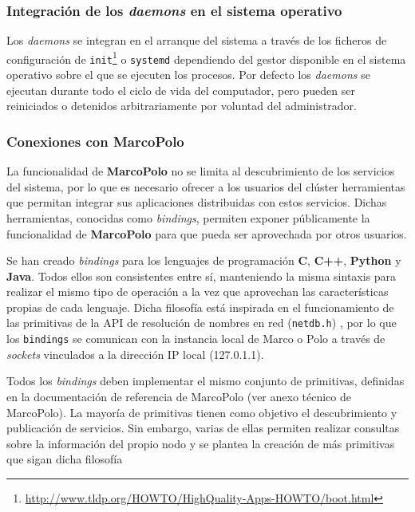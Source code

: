 \subsubsection{Integración de los \textit{daemons} en el sistema operativo}

Los \textit{daemons} se integran en el arranque del sistema a través de los ficheros de configuración de \texttt{init}\footnote{\href{http://www.tldp.org/HOWTO/HighQuality-Apps-HOWTO/boot.html}{http://www.tldp.org/HOWTO/HighQuality-Apps-HOWTO/boot.html}} o \texttt{systemd} dependiendo del gestor disponible en el sistema operativo sobre el que se ejecuten los procesos. Por defecto los \textit{daemons} se ejecutan durante todo el ciclo de vida del computador, pero pueden ser reiniciados o detenidos arbitrariamente por voluntad del administrador.

\subsubsection{Conexiones con MarcoPolo}
\label{marcopolo:bindings}
La funcionalidad de \textbf{MarcoPolo} no se limita al descubrimiento de los servicios del sistema, por lo que es necesario ofrecer a los usuarios del clúster herramientas que permitan integrar sus aplicaciones distribuidas con estos servicios. Dichas herramientas, conocidas como \textit{bindings}, permiten exponer públicamente la funcionalidad de \textbf{MarcoPolo} para que pueda ser aprovechada por otros usuarios.

Se han creado \textit{bindings} para los lenguajes de programación \textbf{C}, \textbf{C++}, \textbf{Python} y \textbf{Java}. Todos ellos son consistentes entre sí, manteniendo la misma sintaxis para realizar el mismo tipo de operación a la vez que aprovechan las características propias de cada lenguaje. Dicha filosofía está inspirada en el funcionamiento de las primitivas de la API de resolución de nombres en red (\texttt{netdb.h}) \cite{netdb}, por lo que los \texttt{bindings} se comunican con la instancia local de Marco o Polo a través de \textit{sockets} vinculados a la dirección IP local (127.0.1.1).

Todos los \textit{bindings} deben implementar el mismo conjunto de primitivas, definidas en la documentación de referencia de MarcoPolo (ver anexo técnico de MarcoPolo). La mayoría de primitivas tienen como objetivo el descubrimiento y publicación de servicios. Sin embargo, varias de ellas permiten realizar consultas sobre la información del propio nodo y se plantea la creación de más primitivas que sigan dicha filosofía
 
